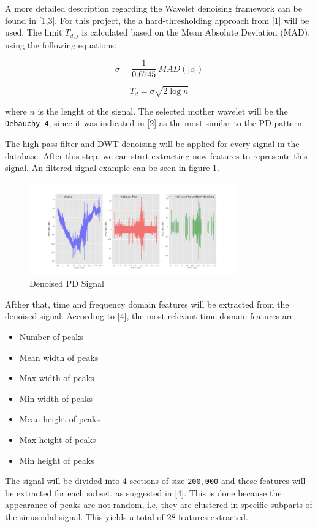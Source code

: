 \documentclass[11pt]{article}
\providecommand{\tightlist}{%
      \setlength{\itemsep}{0pt}\setlength{\parskip}{0pt}}
\begin{document}
A more detailed description regarding the Wavelet denoising framework
can be found in {[}1,3{]}. For this project, the a hard-thresholding
approach from {[}1{]} will be used. The limit \(T_{d,j}\) is calculated
based on the Mean Absolute Deviation (MAD), using the following
equations:

\[\sigma = \frac{1}{0.6745}~MAD(|c|) \]

\[T_{d} = \sigma\sqrt{2\log{n}} \]

where \(n\) is the lenght of the signal. The selected mother wavelet
will be the \texttt{Debauchy\ 4}, since it was indicated in {[}2{]} as
the most similar to the PD pattern.

The high pass filter and DWT denoising will be applied for every signal
in the database. After this step, we can start extracting new features
to represente this signal. An filtered signal example can be seen in
figure \ref{fig:pdsignal_dn}.

\begin{figure}[h]
\centering
\includegraphics[width=0.8\textwidth]{signal_phase_denoised.png}
\caption{Denoised PD Signal}
\label{fig:pdsignal_dn}
\end{figure}

Afther that, time and frequency domain features will be extracted from
the denoised signal. According to {[}4{]}, the most relevant time domain
features are:

\begin{itemize}
\tightlist
\item
  Number of peaks
\item
  Mean width of peaks
\item
  Max width of peaks
\item
  Min width of peaks
\item
  Mean height of peaks
\item
  Max height of peaks
\item
  Min height of peaks
\end{itemize}

The signal will be divided into 4 sections of size \texttt{200,000} and
these features will be extracted for each subset, as suggested in
{[}4{]}. This is done because the appearance of peaks are not random,
i.e, they are clustered in specific subparts of the sinusoidal signal.
This yields a total of 28 features extracted.
\end{document}
